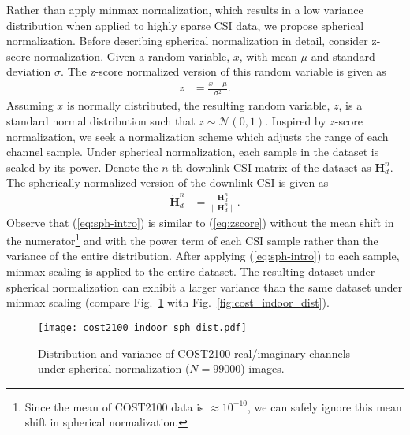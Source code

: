 \label{sect:sph_norm_method}
Rather than apply minmax normalization, which results in a low variance distribution when applied to highly sparse CSI data, we propose spherical normalization. Before describing spherical normalization in detail, consider z-score normalization. Given a random variable, $x$, with mean $\mu$ and standard deviation $\sigma$. The z-score normalized version of this random variable is given as
\begin{align}
	z &= \frac{x - \mu}{\sigma^2}. \label{eq:zscore}
\end{align}
Assuming $x$ is normally distributed, the resulting random variable, $z$, is a standard normal distribution such that $z \sim \mathcal N(0,1)$. Inspired by $z$-score normalization, we seek a normalization scheme which adjusts the range of each channel sample. Under spherical normalization, each sample in the dataset is scaled by its power. Denote the $n$-th downlink CSI matrix of the dataset as $\mathbf H_d^n$. The spherically normalized version of the downlink CSI is given as
\begin{align}
	\mathbf{\check H}_d^n &= \frac{\mathbf H_d^n}{\|\mathbf H_d^n\|}. \label{eq:sph-intro}
\end{align}
Observe that (\ref{eq:sph-intro}) is similar to (\ref{eq:zscore}) without the mean shift in the numerator\footnote{Since the mean of COST2100 data is $\approx 10^{-10}$, we can safely ignore this mean shift in spherical normalization.} and with the power term of each CSI sample rather than the variance of the entire distribution. After applying (\ref{eq:sph-intro}) to each sample, minmax scaling is applied to the entire dataset. The resulting dataset under spherical normalization can exhibit a larger variance than the same dataset under minmax scaling (compare Fig.~\ref{fig:cost_indoor_sph_dist} with Fig.~\ref{fig:cost_indoor_dist}). 
\begin{figure}[htb]
	\centering
	\texttt{[image: cost2100\_indoor\_sph\_dist.pdf]}
	\medskip
	\caption{Distribution and variance of COST2100 real/imaginary channels under spherical normalization ($N=99000$) images.}
	\label{fig:cost_indoor_sph_dist}
\end{figure}

